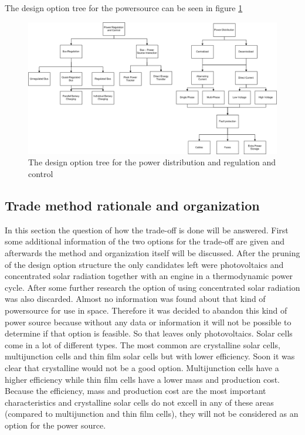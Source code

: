 The design option tree for the powersource can be seen in figure \ref{fig:DOTeps_reganddisPruned}

\begin{figure}
\centering
\includegraphics[width=\textheight, angle=90]{chapters/img/DOTeps_reganddisPruned.png}
\caption{The design option tree for the power distribution and regulation and control}
\label{fig:DOTeps_reganddisPruned}
\end{figure}



\subsection{Trade method rationale and organization}
In this section the question of how the trade-off is done will be answered. First some additional information of the two options for the trade-off
are given and afterwards the method and organization itself will be discussed.
After the pruning of the design option structure the only candidates left were photovoltaics and concentrated solar radiation together with an engine in a thermodynamic power cycle. 
After some further research the option of using concentrated solar radiation was also discarded. Almost no information was found about that
kind of powersource for use in space. Therefore it was decided to abandon this kind of power source because without any data or information 
it will not be possible to determine if that option is feasible. So that leaves only photovoltaics. 
Solar cells come in a lot of different types. The most common are crystalline solar cells, multijunction cells and thin film solar cells but with lower efficiency. Soon it was clear that crystalline would not be a good option. Multijunction cells have a higher efficiency while thin film cells have a lower mass and production cost. Because the efficiency, mass and production cost are the most important characteristics and crystalline solar cells do not excell in any of these areas (compared to multijunction and thin film cells), they will not be considered as an option for the power source.
 
